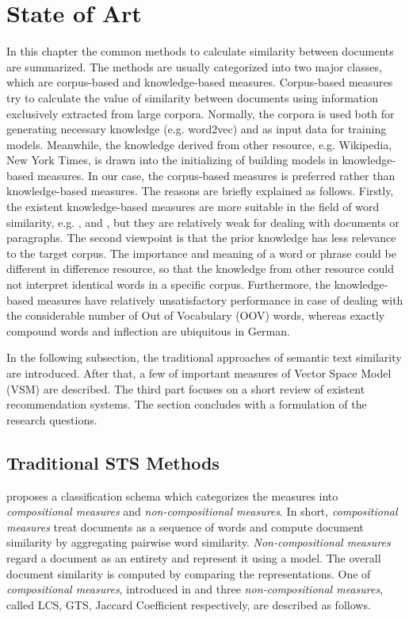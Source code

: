 \section{State of Art}
\label{sec:2}

In this chapter the common methods to calculate similarity between documents are summarized. The methods are usually categorized into two major classes, which are corpus-based and knowledge-based measures. Corpus-based measures try to calculate the value of similarity between documents using information exclusively extracted from large corpora. Normally, the corpora is used both for generating necessary knowledge (e.g. word2vec) and as input data for training models. Meanwhile, the knowledge derived from other resource, e.g. Wikipedia, New York Times, is drawn into the initializing of building models in knowledge-based measures. In our case, the corpus-based measures is preferred rather than knowledge-based measures. The reasons are briefly explained as follows. Firstly, the existent knowledge-based measures are more suitable in the field of word similarity, e.g. \cite{jiang1997semantic}, \cite{strube2006wikirelate} and \cite{Agirre2009ta}, but they are relatively weak for dealing with documents or paragraphs. The second viewpoint is that the prior knowledge has less relevance to the target corpus. The importance and meaning of a word or phrase could be different in difference resource, so that the knowledge from other resource could not interpret identical words in a specific corpus.  Furthermore, the knowledge-based measures have relatively unsatisfactory performance in case of dealing with the considerable number of Out of Vocabulary (OOV) words, whereas exactly compound words and inflection are ubiquitous in German.

In the following subsection, the traditional approaches of semantic text similarity are introduced. After that, a few of important measures of Vector Space Model (VSM) are described. The third part focuses on a short review of existent recommendation systems. The section concludes with a formulation of the research questions. 

\subsection{Traditional STS Methods}
\label{sec:2.1}

\cite{bar2013composite} proposes a classification schema which categorizes the measures into \textit{compositional measures} and \textit{non-compositional measures}. In short, \textit{compositional measures} treat documents as a sequence of words and compute document similarity by aggregating pairwise word similarity.  \textit{Non-compositional measures} regard a document as an entirety and represent it using a model. The overall document similarity is computed by comparing the representations. One of \textit{compositional measures}, introduced in \cite{islam2008semantic} and three \textit{non-compositional measures}, called LCS, GTS, Jaccard Coefficient respectively, are described as follows.

